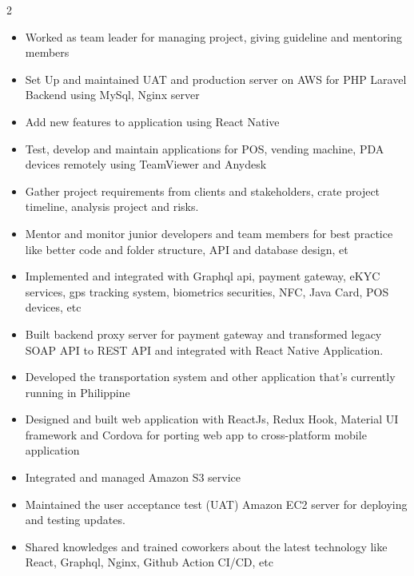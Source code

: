 \documentclass[10pt,a4paper,ragged2e,withhyper]{altacv}
\begin{document}
\begin{paracol}{2}
            \begin{itemize}
                \item Worked as team leader for managing project, giving guideline and mentoring members
                \item Set Up and maintained UAT and production server on AWS for PHP Laravel Backend using MySql, Nginx server
                \item Add new features to application using React Native
            \divider
            \end{itemize}

            \begin{itemize}
                \item Test, develop and maintain applications for POS, vending machine, PDA devices remotely using TeamViewer and Anydesk
                \item Gather project requirements from clients and stakeholders, crate project timeline, analysis project and risks.
                \item Mentor and monitor junior developers and team members for best practice like better code and folder structure, API and database design, et
                \item Implemented and integrated with Graphql api, payment gateway, eKYC services, gps tracking system, biometrics securities, NFC, Java Card, POS devices, etc
                \item Built backend proxy server for payment gateway and transformed legacy SOAP API to REST API and integrated with React Native Application.
                \item Developed the transportation system and other application that's currently running in Philippine
            \end{itemize}
            \divider

            \begin{itemize}
                \item Designed and built web application with ReactJs, Redux Hook, Material UI framework and Cordova for porting web app to cross-platform mobile application
                \item Integrated and managed Amazon S3 service
                \item Maintained the user acceptance test (UAT) Amazon EC2 server for deploying and testing updates.
                \item Shared knowledges and trained coworkers about the latest technology like React, Graphql, Nginx, Github Action CI/CD, etc
            \end{itemize}
            \divider


\end{paracol}
\end{document}
